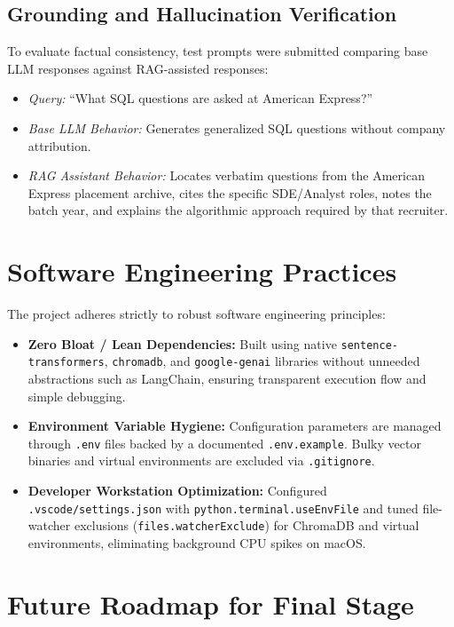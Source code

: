 \documentclass[11pt]{article}
\begin{document}
\subsection{Grounding and Hallucination Verification}
To evaluate factual consistency, test prompts were submitted comparing base LLM responses against RAG-assisted responses:
\begin{itemize}[leftmargin=1.5em]
    \item \textit{Query:} ``What SQL questions are asked at American Express?''
    \item \textit{Base LLM Behavior:} Generates generalized SQL questions without company attribution.
    \item \textit{RAG Assistant Behavior:} Locates verbatim questions from the American Express placement archive, cites the specific SDE/Analyst roles, notes the batch year, and explains the algorithmic approach required by that recruiter.
\end{itemize}

\section{Software Engineering Practices}

The project adheres strictly to robust software engineering principles:
\begin{itemize}[leftmargin=1.5em]
    \item \textbf{Zero Bloat / Lean Dependencies:} Built using native \texttt{sentence-transformers}, \texttt{chromadb}, and \texttt{google-genai} libraries without unneeded abstractions such as LangChain, ensuring transparent execution flow and simple debugging.
    \item \textbf{Environment Variable Hygiene:} Configuration parameters are managed through \texttt{.env} files backed by a documented \texttt{.env.example}. Bulky vector binaries and virtual environments are excluded via \texttt{.gitignore}.
    \item \textbf{Developer Workstation Optimization:} Configured \texttt{.vscode/settings.json} with \texttt{python.terminal.useEnvFile} and tuned file-watcher exclusions (\texttt{files.watcherExclude}) for ChromaDB and virtual environments, eliminating background CPU spikes on macOS.
\end{itemize}

\section{Future Roadmap for Final Stage}
\end{document}
